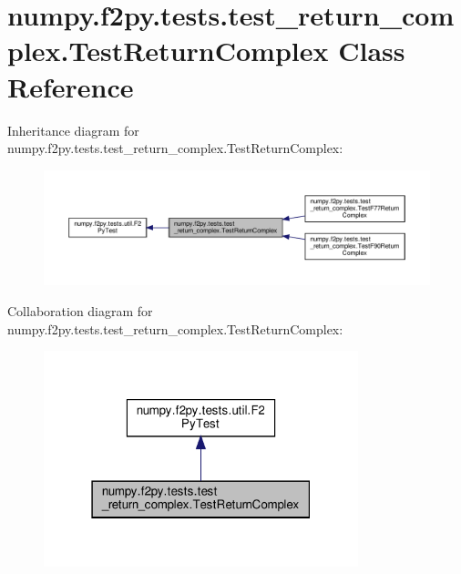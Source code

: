 \hypertarget{classnumpy_1_1f2py_1_1tests_1_1test__return__complex_1_1TestReturnComplex}{}\section{numpy.\+f2py.\+tests.\+test\+\_\+return\+\_\+complex.\+Test\+Return\+Complex Class Reference}
\label{classnumpy_1_1f2py_1_1tests_1_1test__return__complex_1_1TestReturnComplex}


Inheritance diagram for numpy.\+f2py.\+tests.\+test\+\_\+return\+\_\+complex.\+Test\+Return\+Complex\+:
\nopagebreak
\begin{figure}[H]
\begin{center}
\leavevmode
\includegraphics[width=350pt]{classnumpy_1_1f2py_1_1tests_1_1test__return__complex_1_1TestReturnComplex__inherit__graph}
\end{center}
\end{figure}


Collaboration diagram for numpy.\+f2py.\+tests.\+test\+\_\+return\+\_\+complex.\+Test\+Return\+Complex\+:
\nopagebreak
\begin{figure}[H]
\begin{center}
\leavevmode
\includegraphics[width=259pt]{classnumpy_1_1f2py_1_1tests_1_1test__return__complex_1_1TestReturnComplex__coll__graph}
\end{center}
\end{figure}
